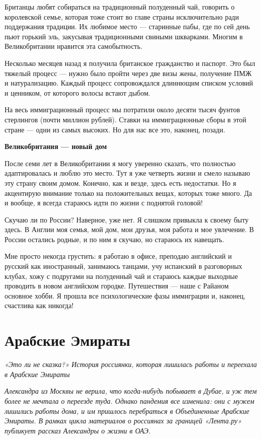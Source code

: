Британцы любят собираться на традиционный полуденный чай, говорить о королевской семье, которая тоже стоит во главе страны исключительно ради поддержания традиции. Их любимое место — старинные пабы, где по сей день пьют горький эль, закусывая традиционными свиными шкварками. Многим в Великобритании нравится эта самобытность.

Несколько месяцев назад я получила британское гражданство и паспорт. Это был тяжелый процесс — нужно было пройти через две визы жены, получение ПМЖ и натурализацию. Каждый процесс сопровождался длиннющим списком условий и ценником, от которого волосы встают дыбом.

На весь иммиграционный процесс мы потратили около десяти тысяч фунтов стерлингов (почти миллион рублей). Ставки на иммиграционные сборы в этой стране — одни из самых высоких. Но для нас все это, наконец, позади.

\textbf{Великобритания — новый дом}

После семи лет в Великобритании я могу уверенно сказать, что полностью адаптировалась и люблю это место. Тут я уже четверть жизни и смело называю эту страну своим домом. Конечно, как и везде, здесь есть недостатки. Но я акцентирую внимание только на положительных вещах, которых тоже много. Да и вообще, я всегда стараюсь идти по жизни с поднятой головой!

Скучаю ли по России? Наверное, уже нет. Я слишком привыкла к своему быту здесь. В Англии моя семья, мой дом, мои друзья, моя работа и мое увлечение. В России остались родные, и по ним я скучаю, но стараюсь их навещать.

Мне просто некогда грустить: я работаю в офисе, преподаю английский и русский как иностранный, занимаюсь танцами, учу испанский в разговорных клубах, хожу с подругами на полуденный чай и стараюсь каждые выходные проводить в новом английском городке. Путешествия — наше с Райаном основное хобби. Я прошла все психологические фазы иммиграции и, наконец, счастлива как никогда!

\newpage
\section{Арабские Эмираты}

\textit{«Это ли не сказка?» История россиянки, которая лишилась работы и переехала в Арабские Эмираты}

\textit{Александра из Москвы не верила, что когда-нибудь побывает в Дубае, и уж тем более не мечтала о переезде туда. Однако пандемия все изменила: они с мужем лишились работы дома, и им пришлось перебраться в Объединенные Арабские Эмираты. В рамках цикла материалов о россиянах за границей «Лента.ру» публикует рассказ Александры о жизни в ОАЭ.}

